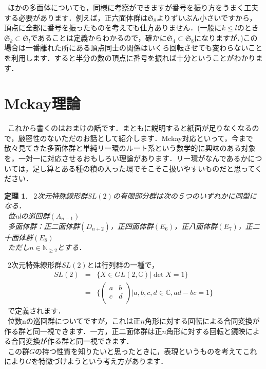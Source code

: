 \documentclass{jreport}
\theoremstyle{idefinition}
\newtheorem{ithm}[idefi]{定理}
\begin{document}
\ ほかの多面体についても，同様に考察ができますが番号を振り方をうまく工夫する必要があります．例えば，正六面体群は$\mathfrak{S}_8$よりずいぶん小さいですから，頂点に全部に番号を振ったものを考えても仕方ありません．(一般に$k\leq l$のとき$\mathfrak{S}_k \subset \mathfrak{S}_l$であることは定義からわかるので，確かに$\mathfrak{S}_4 \subset \mathfrak{S}_8$になりますが．)この場合は一番離れた所にある頂点同士の関係はいくら回転させても変わらないことを利用します．すると半分の数の頂点に番号を振れば十分ということがわかります．\\

\section{Mckay理論}
\ これから書くのはおまけの話です．まともに説明すると紙面が足りなくなるので，厳密性のないただのお話として紹介します．Mckay対応といって，今まで散々見てきた多面体群と単純リー環のルート系という数学的に興味のある対象を，一対一に対応させるおもしろい理論があります．リー環がなんであるかについては，足し算とある種の積の入った環でそこそこ扱いやすいものだと思ってください．\\
\begin{ithm}
\ $2$次元特殊線形群$SL(2)$の有限部分群は次の５つのいずれかに同型になる．\\
\ 位nlの巡回群$(A_{n-1})$\\
\ 多面体群：正二面体群$(D_{n+2})$，正四面体群$(E_6)$，正八面体群$(E_7)$，正二十面体群$(E_8)$\\
\ ただし$n \in\mathbb{N}_{ \geq 2}$とする．
\end{ithm}
\ $2$次元特殊線形群$SL(2)$とは行列群の一種で，
\begin{eqnarray*}
SL(2)&=&\{X\in GL(2,\mathbb{C}) | \det X=1\}\\
&=&\{
\begin{pmatrix} 
a&b\\ 
c&d\\ 
\end{pmatrix}
| a,b,c,d \in \mathbb{C} ,ad-bc=1\}
\end{eqnarray*}
\ で定義されます．\\
\ 位数nの巡回群についてですが，これは正$n$角形に対する回転による合同変換が作る群と同一視できます．一方，正二面体群は正$n$角形に対する回転と鏡映による合同変換が作る群と同一視できます．\\
\ この群$G$の持つ性質を知りたいと思ったときに，表現というものを考えてこれにより$G$を特徴づけようという考え方があります．\\
\end{document}

